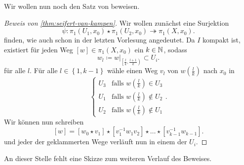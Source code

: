 Wir wollen nun noch den Satz von  beweisen.

\begin{proof}[Beweis von \autoref{thm:seifert-van-kampen}]
    Wir wollen zunächst eine Surjektion
    \[
\psi \colon         \pi_1(U_1,x_0) \star \pi_1(U_2,x_0) \twoheadrightarrow \pi_1(X,x_0)
    .\] 
    finden, wie auch schon in der letzten Vorlesung angedeutet. Da $I$ kompakt ist, existiert  für jeden Weg $[w] \in \pi_1(X,x_0)$ ein $k\in \mathbb{N}$, sodass
    \[
w_l \coloneqq         w|_{\left[ \frac{l}{k}, \frac{l+1}{k} \right) } \subset U_i
    .\] 
    für alle $l$. Für alle  $l\in \left \{1,k-1\right\}$ wähle einen Weg $v_l$ von  $w\left( \frac{l}{k} \right) $ nach $x_0$ in 
    \[
    \begin{cases}
        U_3 & \text{falls } w\left( \frac{l}{k} \right) \in U_3 \\
        U_1 & \text{falls } w\left( \frac{l}{k} \right) \not\in U_2 \\
        U_2 & \text{falls } w\left( \frac{l}{k} \right)  \not\in U_1
    \end{cases}
    .\] 
    Wir können nun schreiben
    \[
        [w] = [w_0\star v_1] \star [v_1^{-1} w_1 v_2] \star \ldots \star [v_{k-1}^{-1}w_{k-1}]
    .\] 
    und jeder der geklammerten Wege verläuft nun in einem der $U_i$.
\end{proof}

\begin{remark*}
    An dieser Stelle fehlt eine Skizze zum weiteren Verlauf des Beweises.
\end{remark*}

